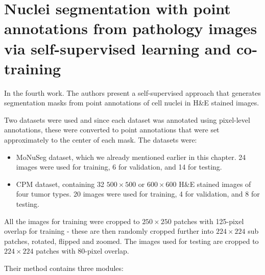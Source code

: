 \section{Nuclei segmentation with point annotations from pathology images via self-supervised learning and co-training \cite{Lin2023}}
\label{section:related-4}

In the fourth work. The authors present a self-supervised approach that generates segmentation masks from point annotations of cell nuclei in H\&E stained images.

Two datasets were used and since each dataset was annotated using pixel-level annotations, these were converted to point annotations that were set approximately to the center of each mask. The datasets were:

\begin{itemize}
    \item MoNuSeg dataset, which we already mentioned earlier in this chapter. 24 images were used for training, 6 for validation, and 14 for testing.
    \item CPM dataset, containing 32 $500\!\times\!500$ or $600\!\times\!600$ H\&E stained images of four tumor types. 20 images were used for training, 4 for validation, and 8 for testing.
\end{itemize}

All the images for training were cropped to $250\!\times\!250$ patches with 125-pixel overlap for training - these are then randomly cropped further into $224\!\times\!224$ sub patches, rotated, flipped and zoomed. The images used for testing are cropped to $224\!\times\!224$ patches with 80-pixel overlap.

Their method contains three modules:

